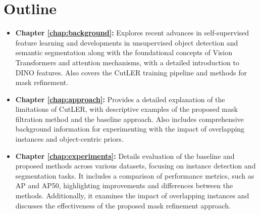 \section{Outline}
\begin{itemize}
	 \item \textbf{Chapter \ref{chap:background}:} Explores recent advances in self-supervised feature learning and developments in unsupervised object detection and semantic segmentation along with the foundational concepts of Vision Transformers and attention mechanisms, with a detailed introduction to DINO features. Also covers the CutLER training pipeline and methods for mask refinement. 
	 
    \item \textbf{Chapter \ref{chap:approach}:} Provides a detailed explanation of the limitations of CutLER, with descriptive examples of the proposed mask filtration method and the baseline approach. Also includes comprehensive background information for experimenting with the impact of overlapping instances and object-centric priors.
    
    \item \textbf{Chapter \ref{chap:experiments}:} Details evaluation of the baseline and proposed methods across various datasets, focusing on instance detection and segmentation tasks. It includes a comparison of performance metrics, such as AP and AP50, highlighting improvements and differences between the methods. Additionally, it examines the impact of overlapping instances and discusses the effectiveness of the proposed mask refinement approach.
\end{itemize}
